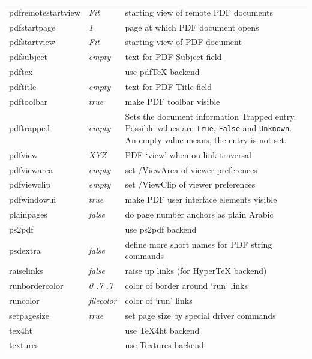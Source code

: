 \documentclass{article}
\begin{document}
\begin{longtable}{@{}>{\ttfamily}llp{7cm}@{}}
pdfremotestartview & \textit{Fit}           & starting view of remote PDF documents \\
pdfstartpage       & \textit{1}             & page at which PDF document opens \\
pdfstartview       & \textit{Fit}           & starting view of PDF document \\
pdfsubject         & \textit{empty}         & text for PDF Subject field \\
pdftex             &                        & use \textsf{pdf\TeX} backend \\
pdftitle           & \textit{empty}         & text for PDF Title field \\
pdftoolbar         & \textit{true}          & make PDF toolbar visible \\
pdftrapped         & \textit{empty} & Sets the document information Trapped entry.
  Possible values are \texttt{True}, \texttt{False} and \texttt{Unknown}.
  An empty value means, the entry is not set.\\
pdfview            & \textit{XYZ}           & PDF `view' when on link traversal \\
pdfviewarea        & \textit{empty}         & set /ViewArea of viewer preferences \\
pdfviewclip        & \textit{empty}         & set /ViewClip of viewer preferences \\
pdfwindowui        & \textit{true}          & make PDF user interface elements visible \\
plainpages         & \textit{false}         & do page number anchors as plain Arabic \\
ps2pdf             &                        & use \textsf{ps2pdf} backend \\
psdextra           & \textit{false}         & define more short names for PDF string commands \\
raiselinks         & \textit{false}         & raise up links (for \textsf{Hyper\TeX} backend) \\
runbordercolor     & \textit{0 .7 .7}       & color of border around `run' links \\
runcolor           & \textit{filecolor}     & color of `run' links\\
setpagesize        & \textit{true}          & set page size by special driver commands \\
tex4ht             &                        & use \textsf{\TeX4ht} backend \\
textures           &                        & use \textsf{Textures} backend \\

\end{longtable}
\end{document}
